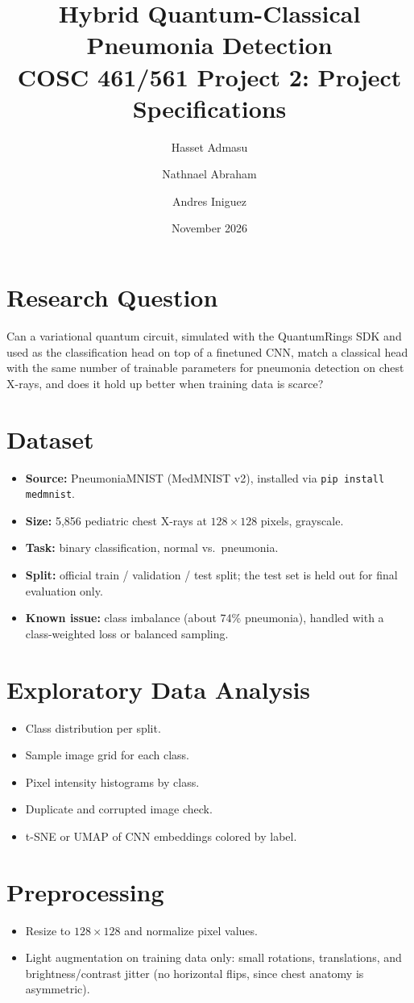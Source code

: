 \documentclass[11pt]{article}
\title{\textbf{Hybrid Quantum-Classical Pneumonia Detection}\\[4pt]
\large COSC 461/561 Project 2: Project Specifications}
\author{Hasset Admasu \and Nathnael Abraham \and Andres Iniguez}
\date{November 2026}
\begin{document}
\maketitle

\section{Research Question}
Can a variational quantum circuit, simulated with the QuantumRings SDK and used as the
classification head on top of a finetuned CNN, match a classical head with the same number
of trainable parameters for pneumonia detection on chest X-rays, and does it hold up better
when training data is scarce?

\section{Dataset}
\begin{itemize}
  \item \textbf{Source:} PneumoniaMNIST (MedMNIST v2), installed via \texttt{pip install medmnist}.
  \item \textbf{Size:} 5,856 pediatric chest X-rays at $128\times128$ pixels, grayscale.
  \item \textbf{Task:} binary classification, normal vs.\ pneumonia.
  \item \textbf{Split:} official train / validation / test split; the test set is held out for final evaluation only.
  \item \textbf{Known issue:} class imbalance (about 74\% pneumonia), handled with a class-weighted loss or balanced sampling.
\end{itemize}

\section{Exploratory Data Analysis}
\begin{itemize}
  \item Class distribution per split.
  \item Sample image grid for each class.
  \item Pixel intensity histograms by class.
  \item Duplicate and corrupted image check.
  \item t-SNE or UMAP of CNN embeddings colored by label.
\end{itemize}

\section{Preprocessing}
\begin{itemize}
  \item Resize to $128\times128$ and normalize pixel values.
  \item Light augmentation on training data only: small rotations, translations, and brightness/contrast
        jitter (no horizontal flips, since chest anatomy is asymmetric).
\end{itemize}
\end{document}
